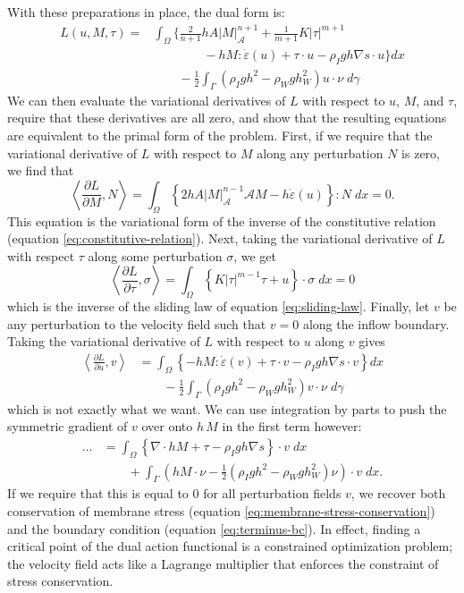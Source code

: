 \documentclass{article}
\theoremstyle{definition}
\theoremstyle{plain}
\begin{document}
With these preparations in place, the dual form is:
\begin{align}
    L(u, M, \tau) = & \int_\Omega\Bigg\{\frac{2}{n + 1}hA|M|_{\mathscr A}^{n + 1} + \frac{1}{m + 1}K|\tau|^{m + 1} \nonumber\\
    & \qquad\qquad - hM:\dot\varepsilon(u) + \tau\cdot u - \rho_Igh\nabla s\cdot u\Bigg\}dx \nonumber \\
    & \qquad - \frac{1}{2}\int_\Gamma\left(\rho_Igh^2 - \rho_Wgh_W^2\right)u\cdot\nu\;d\gamma
    \label{eq:ssa-dual-form}
\end{align}
We can then evaluate the variational derivatives of $L$ with respect to $u$, $M$, and $\tau$, require that these derivatives are all zero, and show that the resulting equations are equivalent to the primal form of the problem.
First, if we require that the variational derivative of $L$ with respect to $M$ along any perturbation $N$ is zero, we find that
\begin{equation}
    \left\langle\frac{\partial L}{\partial M}, N\right\rangle = \int_\Omega\left\{2hA|M|_{\mathscr{A}}^{n - 1}\mathscr{A}M - h\dot\varepsilon(u)\right\} : N\; dx = 0.
\end{equation}
This equation is the variational form of the inverse of the constitutive relation (equation \eqref{eq:constitutive-relation}).
Next, taking the variational derivative of $L$ with respect $\tau$ along some perturbation $\sigma$, we get
\begin{equation}
    \left\langle\frac{\partial L}{\partial\tau}, \sigma\right\rangle = \int_\Omega\left\{K|\tau|^{m - 1}\tau + u\right\}\cdot\sigma\;dx = 0
\end{equation}
which is the inverse of the sliding law of equation \eqref{eq:sliding-law}.
Finally, let $v$ be any perturbation to the velocity field such that $v = 0$ along the inflow boundary.
Taking the variational derivative of $L$ with respect to $u$ along $v$ gives
\begin{align}
    \left\langle\frac{\partial L}{\partial u}, v\right\rangle & = \int_\Omega\left\{-hM : \dot\varepsilon(v) + \tau\cdot v - \rho_Igh\nabla s\cdot v\right\}dx \nonumber\\
    & \qquad -\frac{1}{2}\int_{\Gamma}\left(\rho_Igh^2 - \rho_Wgh_W^2\right)v\cdot\nu\;d\gamma
\end{align}
which is not exactly what we want.
We can use integration by parts to push the symmetric gradient of $v$ over onto $h\,M$ in the first term however:
\begin{align}
    \ldots & = \int_\Omega\left\{\nabla\cdot hM + \tau - \rho_Igh\nabla s\right\}\cdot v\;dx \\
    & \qquad + \int_\Gamma\left(hM\cdot\nu - \frac{1}{2}\left(\rho_Igh^2 - \rho_Wgh_W^2\right)\nu\right)\cdot v\;dx.
\end{align}
If we require that this is equal to 0 for all perturbation fields $v$, we recover both conservation of membrane stress (equation \eqref{eq:membrane-stress-conservation}) and the boundary condition (equation \eqref{eq:terminus-bc}).
In effect, finding a critical point of the dual action functional is a constrained optimization problem; the velocity field acts like a Lagrange multiplier that enforces the constraint of stress conservation.
\end{document}
